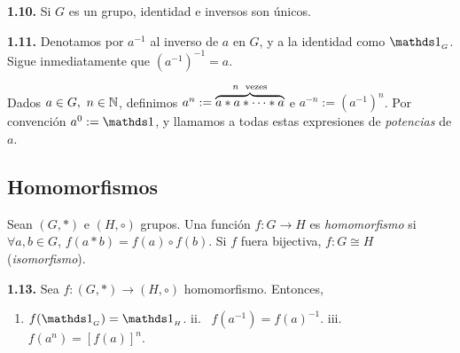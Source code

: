 \begin{theorem}
    \textbf{1.10.} Si \(G\) es un grupo, identidad e inversos son únicos. 
\end{theorem}

\begin{corollary}
    \textbf{1.11.} Denotamos por \(a^{-1}\) al inverso de \(a\) en \(G\), y a la identidad como \(\id_{_G}\). Sigue inmediatamente que \((a^{-1})^{-1} = a\). 
\end{corollary}

\begin{definition}
    Dados \(a \in G, \ n \in \mathbb{N}\), definimos \(a^n := \overbrace{a * a * \cdots * a}^\text{$n$ \text{ vezes}}\) e \(a^{-n} := (a^{-1})^n\). Por convención \(a^0 := \id\), y llamamos a todas estas expresiones de \emph{potencias} de \(a\).
\end{definition}

\subsection*{Homomorfismos}
%
\begin{definition}
    Sean \((G, *)\) e \((H,\circ )\) grupos. Una función \(f: G \to H\) es \emph{homomorfismo} si \(\forall a,b \in G\), \(f(a*b) = f(a) \circ f(b)\). Si \(f\) fuera bijectiva, \(f:G\cong H\) (\emph{isomorfismo}).  
\end{definition}

\begin{theorem}
    \textbf{1.13.} Sea \(f : (G,*) \to (H, \circ)\) homomorfismo. Entonces,  
    \vspace{-0.3cm}
    \begin{enumerate}[label = \roman*., left = 0.3cm]
        \item \(f(\id_{_G}) = \id_{_H}\). \hfill  ii. \ \(f(a^{-1}) = f(a)^{-1}\). \hfill  iii. \ \(f(a^n) = [f(a)]^n\). 
    \end{enumerate} 
\end{theorem}

